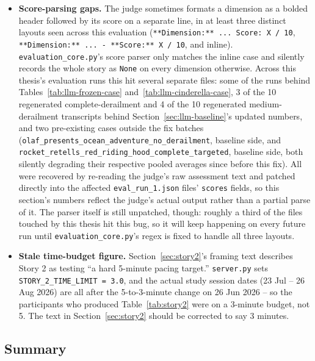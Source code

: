 \documentclass[10pt]{article}
\begin{document}
\begin{itemize}
\item \textbf{Score-parsing gaps.} The judge sometimes formats a dimension as a bolded header followed by its score on a separate line, in at least three distinct layouts seen across this evaluation (\texttt{**Dimension:**\ ...\ Score: X / 10}, \texttt{**Dimension:**\ ...\ - **Score:** X / 10}, and inline). \texttt{evaluation\_core.py}'s score parser only matches the inline case and silently records the whole story as \texttt{None} on every dimension otherwise. Across this thesis's evaluation runs this hit several separate files: some of the runs behind Tables~\ref{tab:llm-frozen-case} and~\ref{tab:llm-cinderella-case}, 3 of the 10 regenerated complete-derailment and 4 of the 10 regenerated medium-derailment transcripts behind Section~\ref{sec:llm-baseline}'s updated numbers, and two pre-existing cases outside the fix batches (\texttt{olaf\_presents\_ocean\_adventure\_no\_derailment}, baseline side, and \texttt{rocket\_retells\_red\_riding\_hood\_complete\_targeted}, baseline side, both silently degrading their respective pooled averages since before this fix). All were recovered by re-reading the judge's raw assessment text and patched directly into the affected \texttt{eval\_run\_1.json} files' \texttt{scores} fields, so this section's numbers reflect the judge's actual output rather than a partial parse of it. The parser itself is still unpatched, though: roughly a third of the files touched by this thesis hit this bug, so it will keep happening on every future run until \texttt{evaluation\_core.py}'s regex is fixed to handle all three layouts.
\item \textbf{Stale time-budget figure.} Section~\ref{sec:story2}'s framing text describes Story 2 as testing ``a hard 5-minute pacing target.'' \texttt{server.py} sets \texttt{STORY\_2\_TIME\_LIMIT = 3.0}, and the actual study session dates (23 Jul -- 26 Aug 2026) are all after the 5-to-3-minute change on 26 Jun 2026 -- so the participants who produced Table~\ref{tab:story2} were on a 3-minute budget, not 5. The text in Section~\ref{sec:story2} should be corrected to say 3 minutes.
\end{itemize}

\subsection{Summary}
\label{sec:llm-summary}
\end{document}
